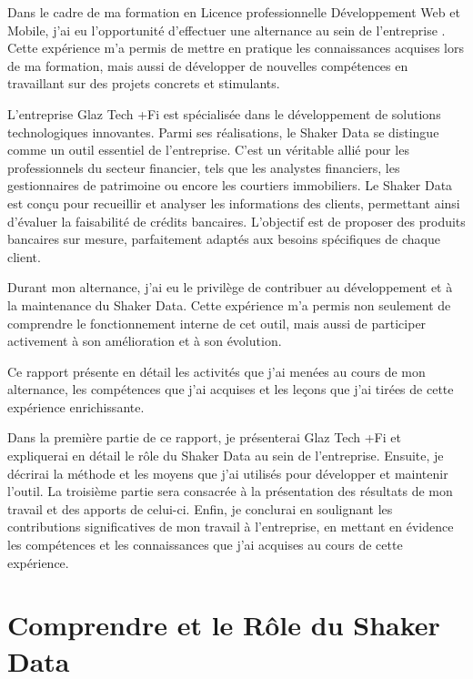 \documentclass[12pt,oneside,noprintercorrection]{iut}
\begin{document}
Dans le cadre de ma formation en Licence professionnelle Développement Web et Mobile, j'ai eu l'opportunité d'effectuer une alternance au sein de l'entreprise \glaz{}. Cette expérience m'a permis de mettre en pratique les connaissances acquises lors de ma formation, mais aussi de développer de nouvelles compétences en travaillant sur des projets concrets et stimulants.

L'entreprise Glaz Tech +Fi est spécialisée dans le développement de solutions technologiques innovantes. Parmi ses réalisations, le Shaker Data se distingue comme un outil essentiel de l'entreprise. C'est un véritable allié pour les professionnels du secteur financier, tels que les analystes financiers, les gestionnaires de patrimoine ou encore les courtiers immobiliers. Le Shaker Data est conçu pour recueillir et analyser les informations des clients, permettant ainsi d'évaluer la faisabilité de crédits bancaires. L'objectif est de proposer des produits bancaires sur mesure, parfaitement adaptés aux besoins spécifiques de chaque client.

Durant mon alternance, j'ai eu le privilège de contribuer au développement et à la maintenance du Shaker Data. Cette expérience m'a permis non seulement de comprendre le fonctionnement interne de cet outil, mais aussi de participer activement à son amélioration et à son évolution.

Ce rapport présente en détail les activités que j'ai menées au cours de mon alternance, les compétences que j'ai acquises et les leçons que j'ai tirées de cette expérience enrichissante.

Dans la première partie de ce rapport, je présenterai Glaz Tech +Fi et expliquerai en détail le rôle du Shaker Data au sein de l'entreprise. Ensuite, je décrirai la méthode et les moyens que j'ai utilisés pour développer et maintenir l'outil. La troisième partie sera consacrée à la présentation des résultats de mon travail et des apports de celui-ci. Enfin, je conclurai en soulignant les contributions significatives de mon travail à l'entreprise, en mettant en évidence les compétences et les connaissances que j'ai acquises au cours de cette expérience.

\NoChapterHead

\chapter{Comprendre \glaz{} et le Rôle du Shaker Data}
\end{document}
